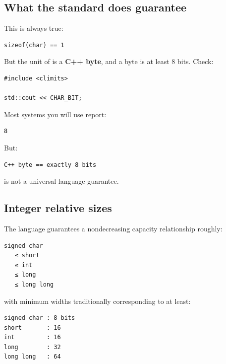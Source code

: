 \subsection{What the standard does guarantee}\label{05-engine-i-ch002-what-the-standard-does-guarantee}

\hypertarget{05-engine-i-ch002-what-the-standard-does-guarantee}{}

This is always true:

\begin{verbatim}
sizeof(char) == 1
\end{verbatim}

But the unit of  is a \textbf{C++ byte}, and a byte is at least 8 bits. Check:

\begin{verbatim}
#include <climits>

std::cout << CHAR_BIT;
\end{verbatim}

Most systems you will use report:

\begin{verbatim}
8
\end{verbatim}

But:

\begin{verbatim}
C++ byte == exactly 8 bits
\end{verbatim}

is not a universal language guarantee.

\subsection{Integer relative sizes}\label{05-engine-i-ch002-integer-relative-sizes}

\hypertarget{05-engine-i-ch002-integer-relative-sizes}{}

The language guarantees a nondecreasing capacity relationship roughly:

\begin{verbatim}
signed char
   ≤ short
   ≤ int
   ≤ long
   ≤ long long
\end{verbatim}

with minimum widths traditionally corresponding to at least:

\begin{verbatim}
signed char : 8 bits
short       : 16
int         : 16
long        : 32
long long   : 64
\end{verbatim}

